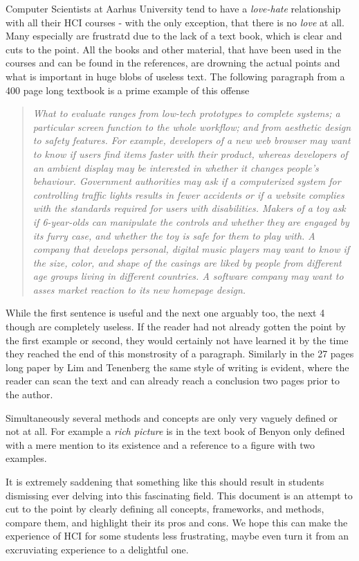 Computer Scientists at Aarhus University tend to have a \emph{love-hate} relationship with all their HCI courses - with the only exception, that there is no \emph{love} at all. Many especially are frustratd due to the lack of a text book, which is clear and cuts to the point. All the books and other material, that have been used in the courses and can be found in the references, are drowning the actual points and what is important in huge blobs of useless text. The following paragraph from a 400 page long textbook is a prime example of this offense

\blockcquote[p. 435]{rogers}{\it What to evaluate ranges from low-tech prototypes to complete systems; a particular screen function to the whole workflow; and from aesthetic design to safety features. For example, developers of a new web browser may want to know if users find items faster with their product, whereas developers of an ambient display may be interested in whether it changes people's behaviour. Government authorities may ask if a computerized system for controlling traffic lights results in fewer accidents or if a website complies with the standards required for users with disabilities. Makers of a toy ask if 6-year-olds can manipulate the controls and whether they are engaged by its furry case, and whether the toy is safe for them to play with. A company that develops personal, digital music players may want to know if the size, color, and shape of the casings are liked by people from different age groups living in different countries. A software company may want to asses market reaction to its new homepage design.}

\noindent While the first sentence is useful and the next one arguably too, the next 4 though are completely useless. If the reader had not already gotten the point by the first example or second, they would certainly not have learned it by the time they reached the end of this monstrosity of a paragraph. Similarly in the 27 pages long paper by Lim and Tenenberg \cite{lim} the same style of writing is evident, where the reader can scan the text and can already reach a conclusion two pages prior to the author.

Simultaneously several methods and concepts are only very vaguely defined or not at all. For example a \emph{rich picture} is in the text book of Benyon only defined with a mere mention to its existence and a reference to a figure with two examples. \cite[p. 51-52]{benyon_14}

It is extremely saddening that something like this should result in students dismissing ever delving into this fascinating field. This document is an attempt to cut to the point by clearly defining all concepts, frameworks, and methods, compare them, and highlight their its pros and cons. We hope this can make the experience of HCI for some students less frustrating, maybe even turn it from an excruviating experience to a delightful one.

